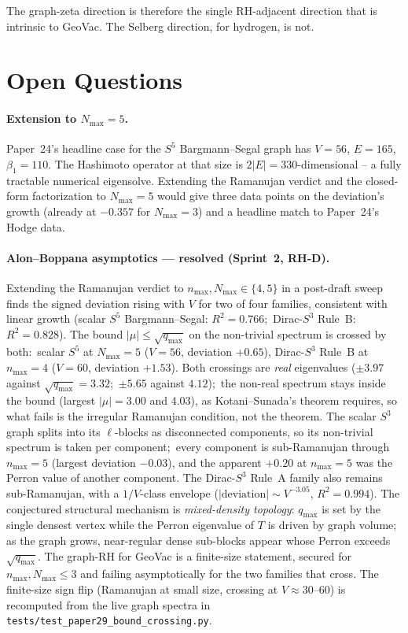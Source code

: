 \documentclass[11pt]{article}
\begin{document}
The graph-zeta direction is therefore the single RH-adjacent direction
that is intrinsic to GeoVac.  The Selberg direction, for hydrogen,
is not.

\section{Open Questions}
\label{sec:open_questions}

\paragraph{Extension to $N_{\max}=5$.}  Paper~24's headline case
for the $S^5$ Bargmann--Segal graph has $V=56$, $E=165$,
$\beta_1=110$.  The Hashimoto operator at that size is $2|E|=330$-dimensional
-- a fully tractable numerical eigensolve.  Extending the Ramanujan
verdict and the closed-form factorization to $N_{\max}=5$ would give
three data points on the deviation's growth (already at $-0.357$
for $N_{\max}=3$) and a headline match to Paper~24's Hodge data.

\paragraph{Alon--Boppana asymptotics --- resolved (Sprint~2, RH-D).}
Extending the Ramanujan verdict to $n_{\max},N_{\max}\in\{4,5\}$ in a
post-draft sweep finds the signed deviation rising with $V$ for two
of four families, consistent with linear growth (scalar $S^5$
Bargmann--Segal: $R^2=0.766$;\ Dirac-$S^3$ Rule~B: $R^2=0.828$).  The
bound $|\mu|\le\sqrt{q_{\max}}$ on the non-trivial spectrum is crossed
by both:\ scalar $S^5$
at $N_{\max}=5$ ($V=56$, deviation $+0.65$), Dirac-$S^3$ Rule~B at
$n_{\max}=4$ ($V=60$, deviation $+1.53$).  Both crossings are
\emph{real} eigenvalues ($\pm3.97$ against $\sqrt{q_{\max}}=3.32$;\
$\pm5.65$ against $4.12$);\ the non-real spectrum stays inside the
bound (largest $|\mu| = 3.00$ and $4.03$), as Kotani--Sunada's theorem
requires, so what fails is the irregular Ramanujan condition, not the
theorem.  The scalar $S^3$ graph
splits into its $\ell$-blocks as disconnected components, so its
non-trivial spectrum is taken per component;\ every component is
sub-Ramanujan through $n_{\max}=5$ (largest deviation $-0.03$), and
the apparent $+0.20$ at $n_{\max}=5$ was the Perron value of another
component.  The Dirac-$S^3$ Rule~A family also remains sub-Ramanujan,
with a $1/V$-class envelope
($|\text{deviation}|\sim V^{-3.05}$, $R^2=0.994$).  The conjectured
structural mechanism is \emph{mixed-density topology}: $q_{\max}$ is
set by the single densest vertex while the Perron eigenvalue of $T$ is
driven by graph volume; as the graph grows, near-regular dense
sub-blocks appear whose Perron exceeds $\sqrt{q_{\max}}$.  The
graph-RH for GeoVac is a finite-size statement, secured for
$n_{\max},N_{\max}\le 3$ and failing asymptotically for the two
families that cross.  The finite-size sign flip (Ramanujan at small size,
crossing at $V\approx 30$--$60$) is recomputed from the live graph
spectra in \texttt{tests/test\_paper29\_bound\_crossing.py}.
\end{document}
